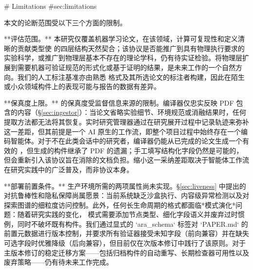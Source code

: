 \begin{markdown}
# Limitations {#sec:limitations}

本文的论断范围受以下三个方面的限制。

**评估范围。** 本研究仅覆盖机器学习论文，在该领域，计算可复现性和定义清晰的贡献类型使 \ara{} 的四层结构天然契合；该协议是否能推广到具有物理执行要求的实验科学，或推广到物理层基本不存在的理论学科，仍有待实证检验。将物理层扩展到需要机器可验证规范的形式化或基于证明的结果，是未来工作的一个自然方向。我们的人工标注基准亦由熟悉 \ara{} 格式及其所选论文的标注者构建，因此在陌生或小众领域构件上的表现可能与报告的数据有差异。

**保真度上限。** \ara{} 的保真度受监督信息来源的限制。编译器仅忠实反映 PDF 包含的内容（\S\ref{sec:ingestor}）：当论文省略实验细节、环境规范或消融结果时，任何提取方法都无法将其恢复。实时研究管理器通过在研究展开过程中记录轨迹来弥补这一差距，但其前提是一个 AI 原生的工作流，即整个项目过程中始终存在一个编码智能体。对于不在此类会话中的研究者，编译器仍能从已完成的论文生成一个有效的 \ara{}，但生成的构件继承了 PDF 的遗漏；手工填写结构化字段仍然是可能的，但会重新引入该协议旨在消除的文档负担。缩小这一采纳差距取决于智能体工作流在研究实践中的广泛普及，而非协议本身。

**部署前置条件。** 生产环境所需的两项属性尚未实现。\S\ref{sec:liveness} 中提出的对抗鲁棒性和隐私保障尚属愿景：当前系统缺乏沙盒执行、内容级异常检测以及对探索图谱的细粒度访问控制。此外，任何长生命周期的格式都面临*模式演化*问题：随着研究实践的变化，\ara{} 模式需要添加节点类型、细化字段语义并废弃过时惯例，同时不破坏既有构件。我们通过显式的 `ara_schema` 标签对 `PAPER.md` 的前置元数据进行版本控制，并要求所有验证器接受未知字段（前向兼容）并在缺失可选字段时优雅降级（后向兼容），但目前仅在次版本修订中践行了该原则。对于主版本修订的稳定迁移方案——包括归档构件的自动重写、长期检查器可用性以及废弃策略——仍有待未来工作完成。
\end{markdown}

